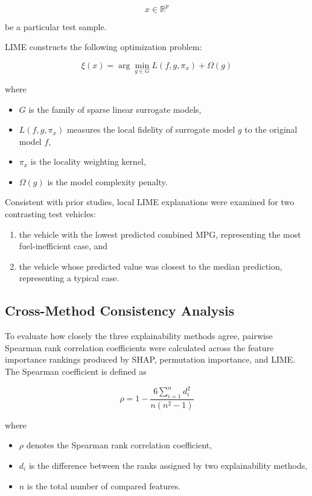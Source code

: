 \[
x\in\mathbb{R}^{p}
\]

be a particular test sample.

LIME constructs the following optimization problem:

\begin{equation}
\xi(x)
=
\arg\min_{g\in G}
L(f,g,\pi_x)
+
\Omega(g)
\label{eq:lime}
\end{equation}

where

\begin{itemize}
\item $G$ is the family of sparse linear surrogate models,
\item $L(f,g,\pi_x)$ measures the local fidelity of surrogate model $g$ to the original model $f$,
\item $\pi_x$ is the locality weighting kernel,
\item $\Omega(g)$ is the model complexity penalty.
\end{itemize}

Consistent with prior studies, local LIME explanations were examined for two contrasting test vehicles:

\begin{enumerate}
\item the vehicle with the lowest predicted combined MPG, representing the most fuel-inefficient case, and
\item the vehicle whose predicted value was closest to the median prediction, representing a typical case.
\end{enumerate}


\subsection{Cross-Method Consistency Analysis}

To evaluate how closely the three explainability methods agree, pairwise Spearman rank correlation coefficients were calculated across the feature importance rankings produced by SHAP, permutation importance, and LIME. The Spearman coefficient is defined as

\begin{equation}
\rho
=
1-
\frac{
6\sum_{i=1}^{n}d_i^2
}
{
n(n^2-1)
}
\label{eq:spearman}
\end{equation}

where

\begin{itemize}
\item $\rho$ denotes the Spearman rank correlation coefficient,
\item $d_i$ is the difference between the ranks assigned by two explainability methods,
\item $n$ is the total number of compared features.
\end{itemize}

